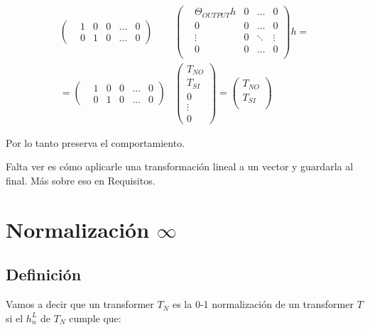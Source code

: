 \documentclass{article}
\begin{document}
\begin{align*}
    \left(\begin{matrix}
        &1 &0 &0 &\dots &0 \\
        &0 &1 &0 &\dots &0 
    \end{matrix}\right)
    &\left(\begin{matrix}
        &\Theta_{OUTPUT}h &0 &\dots  &0 \\
        &0                &0 &\dots  &0 \\
        &\vdots           &0 &\ddots &\vdots \\
        &0                &0 &\dots  &0 \\
    \end{matrix}\right)h = \\
    = \left(\begin{matrix}
        &1 &0 &0 &\dots &0 \\
        &0 &1 &0 &\dots &0 
    \end{matrix}\right)
    &\left(\begin{matrix}
        T_{NO} \\
        T_{SI} \\ 
        0 \\
        \vdots \\
        0
    \end{matrix}\right) = 
    \left(\begin{matrix}
        T_{NO} \\
        T_{SI} \\ 
    \end{matrix}\right)
\end{align*}

Por lo tanto preserva el comportamiento.

Falta ver es cómo aplicarle una transformación lineal a un vector y guardarla al final. Más sobre eso en Requisitos.






\section*{Normalización $\infty$}

\subsection*{Definición}

Vamos a decir que un transformer $T_N$ es la 0-1 normalización de un transformer $T$ si el $h_n^L$ de $T_N$ cumple que:
\end{document}
